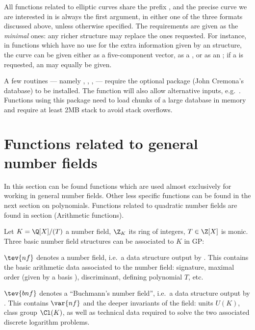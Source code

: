 All functions related to elliptic curves share the prefix , and the
precise curve we are interested in is always the first argument, in either
one of the three formats discussed above, unless otherwise specified. The
requirements are given as the \emph{minimal} ones: any richer structure may
replace the ones requested. For instance, in functions which have no use for
the extra information given by an  structure, the curve can be given
either as a five-component vector, as a , or as an ;
if a  is requested, an  may equally be given.


A few routines --- namely , ,
,  --- require the optional package 
(John Cremona's database) to be installed. The function  will
also allow alternative inputs, e.g.~. Functions using
this package need to load chunks of a large database in memory and require
at least 2MB stack to avoid stack overflows.


\section{Functions related to general number fields}

In this section can be found functions which are used almost exclusively for
working in general number fields. Other less specific functions can be found
in the next section on polynomials. Functions related to quadratic number
fields are found in section  (Arithmetic functions).


Let $K = \Q[X] / (T)$ a number field, $\Z_K$ its ring of integers, $T\in\Z[X]$
is monic. Three basic number field structures can be associated to $K$ in
GP:

\item $\tev{nf}$ denotes a number field, i.e.~a data structure output by
. This contains the basic arithmetic data associated to the
number field: signature, maximal order (given by a basis ),
discriminant, defining polynomial $T$, etc.

\item $\tev{bnf}$ denotes a ``Buchmann's number field'', i.e.~a
data structure output by . This contains
$\var{nf}$ and the deeper invariants of the field: units $U(K)$, class group
$\Cl(K)$, as well as technical data required to solve the two associated
discrete logarithm problems.

